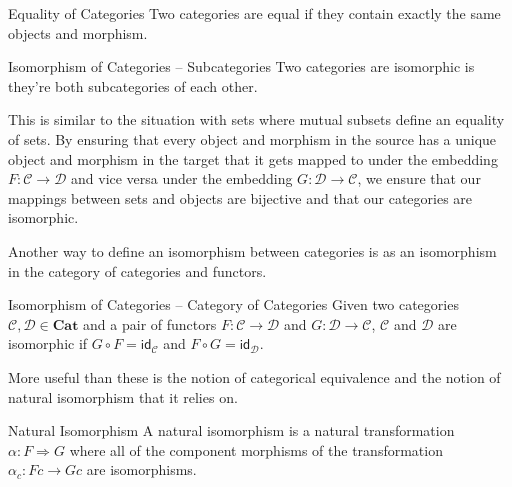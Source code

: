 \documentclass[12pt]{article}
\begin{document}
\begin{definition}{Equality of Categories}{}
    Two categories are equal if they contain exactly the same objects and morphism.
\end{definition}

\begin{definition}{Isomorphism of Categories -- Subcategories}{}
    Two categories are isomorphic is they're both subcategories of each other.
\end{definition}
This is similar to the situation with sets where mutual subsets define an equality of sets.
By ensuring that every object and morphism in the source has a unique object and morphism in the target that it gets mapped to under the embedding $F:\mathcal{C} \rightarrow \mathcal{D}$ and vice versa under the embedding $G:\mathcal{D} \rightarrow \mathcal{C}$,
we ensure that our mappings between sets and objects are bijective and that our categories are isomorphic.

Another way to define an isomorphism between categories is as an isomorphism in the category of categories and functors.
\begin{definition}{Isomorphism of Categories -- Category of Categories}{}
    Given two categories $\mathcal{C}, \mathcal{D} \in \textbf{Cat}$ and a pair of functors $F:\mathcal{C} \rightarrow \mathcal{D}$ and $G:\mathcal{D} \rightarrow \mathcal{C}$,
    $\mathcal{C}$ and $\mathcal{D}$ are isomorphic if $G \circ F = \mathsf{id_\mathcal{C}}$ and $F \circ G = \mathsf{id_\mathcal{D}}$.
\end{definition}


More useful than these is the notion of categorical equivalence and the notion of natural isomorphism that it relies on.

\begin{definition}{Natural Isomorphism}{}
    A natural isomorphism is a natural transformation $\alpha:F\Rightarrow G$ where all of the component morphisms of the transformation $\alpha_{c}:Fc\rightarrow Gc$ are isomorphisms.
\end{definition}
\end{document}

